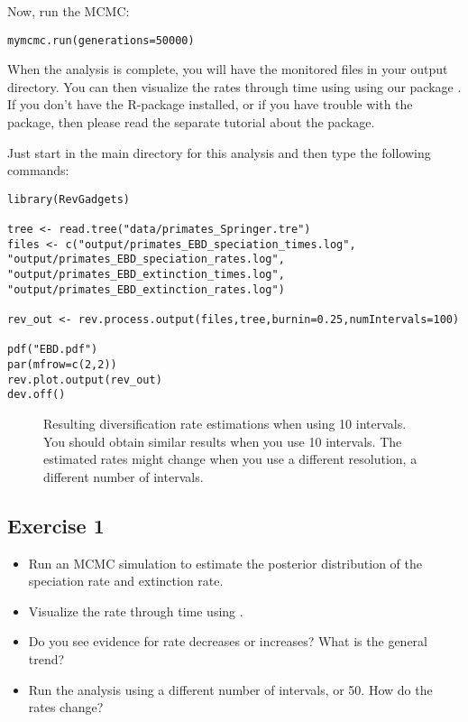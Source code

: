 Now, run the MCMC:
{\tt \begin{snugshade*}
\begin{lstlisting}
mymcmc.run(generations=50000)
\end{lstlisting}
\end{snugshade*}}

When the analysis is complete, you will have the monitored files in your output directory.
You can then visualize the rates through time using \R using our package \RevGadgets.
If you don't have the R-package \RevGadgets installed, or if you have trouble with the package, then please read the separate tutorial about the package.

Just start \R in the main directory for this analysis and then type the following commands:
{\tt \begin{snugshade*}
\begin{lstlisting}
library(RevGadgets)

tree <- read.tree("data/primates_Springer.tre")
files <- c("output/primates_EBD_speciation_times.log", "output/primates_EBD_speciation_rates.log", "output/primates_EBD_extinction_times.log", "output/primates_EBD_extinction_rates.log")

rev_out <- rev.process.output(files,tree,burnin=0.25,numIntervals=100)

pdf("EBD.pdf")
par(mfrow=c(2,2))
rev.plot.output(rev_out)
dev.off()
\end{lstlisting}
\end{snugshade*}}


\begin{figure}[h!]
\centering
{}
\caption{\small Resulting diversification rate estimations when using 10 intervals. You should obtain similar results when you use 10 intervals. The estimated rates might change when you use a different resolution, \IE a different number of intervals.}
\label{fig:EBD_Results}
\end{figure}

\subsection{Exercise 1}

\begin{itemize}
\item Run an MCMC simulation to estimate the posterior distribution of the speciation rate and extinction rate.
\item Visualize the rate through time using \R.
\item Do you see evidence for rate decreases or increases? What is the general trend?
\item Run the analysis using a different number of intervals,  or 50. How do the rates change?
\end{itemize}


